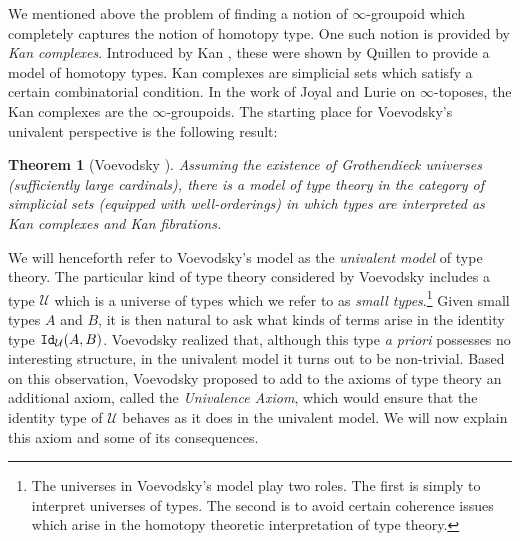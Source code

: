 \documentclass[11pt]{amsart}
\newcommand{\UU}{\mathcal{U}}
\newcommand{\id}[1]{\textnormal{\texttt{Id}}_{#1}}
\newtheorem{theorem}{Theorem}[section]
\theoremstyle{definition}
\theoremstyle{remark}
\numberwithin{equation}{section}
\begin{document}
We mentioned above the problem of finding a notion of
$\infty$-groupoid which completely captures the notion of homotopy
type.  One such notion is provided by \emph{Kan complexes}.
Introduced by Kan \cite{Kan:1957up}, these were shown by Quillen
\cite{Quillen:1967uz} to provide a model of homotopy types.  Kan
complexes are simplicial sets which satisfy a certain combinatorial
condition.  In the work of Joyal \cite{Joyal:2008uc} and Lurie
\cite{Lurie:2009un} on $\infty$-toposes, the Kan complexes are the
$\infty$-groupoids.  The starting place for Voevodsky's univalent
perspective is the following result:
\begin{theorem}[Voevodsky \cite{Voevodsky:2009}]
  Assuming the existence of Grothendieck universes (sufficiently large
  cardinals), there is a model of type theory in the category of
  simplicial sets (equipped with well-orderings) in which types are interpreted as Kan complexes and
  Kan fibrations.
\end{theorem}
We will henceforth refer to Voevodsky's model as the \emph{univalent
  model} of type theory.  The particular kind of type theory
considered by Voevodsky includes a
type $\UU$ which is a universe of types which we refer to  as
\emph{small types}.\footnote{The universes
  in Voevodsky's model play two roles.  The first is simply to
  interpret universes of types.  The second is to avoid certain
  coherence issues which arise in the homotopy theoretic
  interpretation of type theory.}  Given small types $A$ and $B$, it
is then natural to ask what kinds of terms arise in the identity type
$\id{\UU}(A,B)$.  Voevodsky realized
that, although this type \emph{a priori} possesses no interesting
structure, in the univalent model it turns out to be non-trivial.
Based on this observation, Voevodsky proposed to add to the axioms of
type theory an additional axiom, called the \emph{Univalence Axiom},
which would ensure that the identity type of $\UU$ behaves as it does
in the univalent model.  We will now explain this axiom and some of
its consequences.
\end{document}
